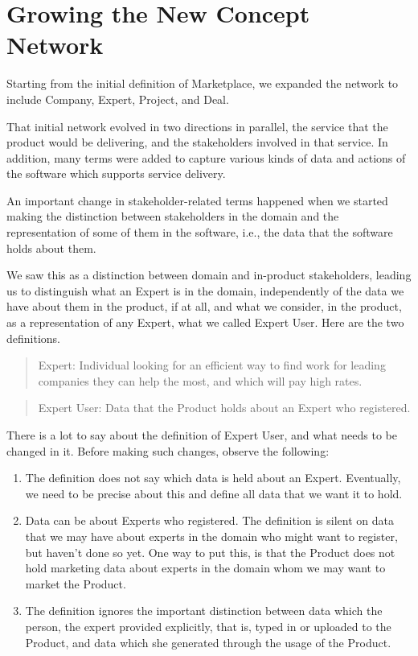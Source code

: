 \documentclass[graybox,envcountchap,sectrefs]{svmono}
\newcommand{\ncnf}{New Concept Network}
\newcommand{\newterm}[1]{\begin{quote}\textsf{#1}\end{quote}}
\newcommand{\nterm}[1]{\textsf{#1}}
\begin{document}
\section{Growing the \ncnf}
Starting from the initial definition of \nterm{Marketplace}, we expanded the network to include \nterm{Company}, \nterm{Expert}, \nterm{Project}, and \nterm{Deal}. 

That initial network evolved in two directions in parallel, the service that the product would be delivering, and the stakeholders involved in that service. In addition, many terms were added to capture various kinds of data and actions of the software which supports service delivery.

An important change in stakeholder-related terms happened when we started making the distinction between stakeholders in the domain and the representation of some of them in the software, i.e., the data that the software holds about them. 

We saw this as a distinction between domain and in-product stakeholders, leading us to distinguish what an \nterm{Expert} is in the domain, independently of the data we have about them in the product, if at all, and what we consider, in the product, as a representation of any \nterm{Expert}, what we called \nterm{Expert User}. Here are the two definitions.

\newterm{Expert: Individual looking for an efficient way to find work for leading companies they can help the most, and which will pay high rates.}

\newterm{Expert User: Data that the Product holds about an Expert who registered.}

There is a lot to say about the definition of \nterm{Expert User}, and what needs to be changed in it. Before making such changes, observe the following:
\begin{enumerate}
	\item The definition does not say which data is held about an \nterm{Expert}. Eventually, we need to be precise about this and define all data that we want it to hold. 
	\item Data can be about \nterm{Experts} who registered. The definition is silent on data that we may have about experts in the domain who might want to register, but haven't done so yet. One way to put this, is that the \nterm{Product} does not hold marketing data about experts in the domain whom we may want to market the \nterm{Product}. 
	\item The definition ignores the important distinction between data which the person, the expert provided explicitly, that is, typed in or uploaded to the \nterm{Product}, and data which she generated through the usage of the \nterm{Product}. 
\end{enumerate}
\end{document}
